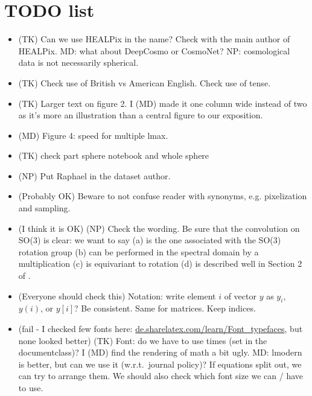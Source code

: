 \documentclass[final,twocolumn,3p,times,sort&compress]{elsarticle}
\newcommand{\1}{\b{1}}              %
\newcommand{\0}{\b{0}}              %
\begin{document}
\section*{TODO list}
\begin{itemize}[noitemsep,topsep=0pt,parsep=0pt,partopsep=0pt]
	\item (TK) Can we use HEALPix in the name? Check with the main author of HEALPix. MD: what about DeepCosmo or CosmoNet? NP: cosmological data is not necessarily spherical.
	\item (TK) Check use of British vs American English. Check use of tense.
	\item (TK) Larger text on figure 2. I (MD) made it one column wide instead of two as it's more an illustration than a central figure to our exposition.
	\item (MD) Figure 4: speed for multiple lmax.
    \item (TK) check part sphere notebook and whole sphere
    \item (NP) Put Raphael in the dataset author.
    \item (Probably OK) Beware to not confuse reader with synonyms, e.g. pixelization and sampling.
    \item (I think it is OK) (NP) Check the wording. Be sure that the convolution on SO(3) is clear: we want to say (a) is the one associated with the SO(3) rotation group (b) can be performed  in the spectral domain by a multiplication (c) is equivariant to rotation (d) is described well in Section 2 of \citep{kondor2018clebsch}.
    \item (Everyone should check this) Notation: write element $i$ of vector $y$ as $y_i$, $y(i)$, or $y[i]$? Be consistent. Same for matrices. Keep indices.
	\item (fail - I checked few fonts here: \url{de.sharelatex.com/learn/Font_typefaces}, but none looked better) (TK) Font: do we have to use times (set in the documentclass)? I (MD) find the rendering of math a bit ugly. MD: lmodern is better, but can we use it (w.r.t.\ journal policy)? If equations split out, we can try to arrange them. We should also check which font size we can / have to use.
\end{itemize}
\end{document}
